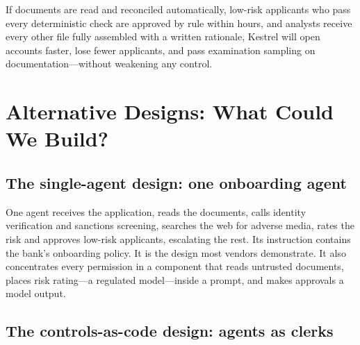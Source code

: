 \begin{keyidea}
If documents are read and reconciled automatically, low-risk applicants who pass every deterministic check are approved by rule within hours, and analysts receive every other file fully assembled with a written rationale, Kestrel will open accounts faster, lose fewer applicants, and pass examination sampling on documentation---without weakening any control.
\end{keyidea}

\section{Alternative Designs: What Could We Build?}
\label{sec:kyc-designs}

\subsection{The single-agent design: one onboarding agent}

One agent receives the application, reads the documents, calls identity verification and sanctions screening, searches the web for adverse media, rates the risk and approves low-risk applicants, escalating the rest. Its instruction contains the bank's onboarding policy. It is the design most vendors demonstrate. It also concentrates every permission in a component that reads untrusted documents, places risk rating---a regulated model---inside a prompt, and makes approvals a model output.

\subsection{The controls-as-code design: agents as clerks}

